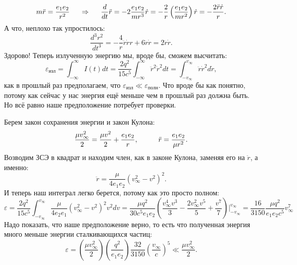 \begin{equation*}
	m \ddot{r} = \frac{e_1 e_2}{r^2}
	\hspace{0.5 cm}
	\Rightarrow
	\hspace{0.5 cm}
	\frac{d}{d t} \ddot{r} = -2 \frac{e_1 e_2}{m r^3} \dot{r} = -\frac{2 }{r} \left(\frac{e_1 e_2}{m r^2}\right) \dot{r} = - \frac{2 \ddot{r} \dot{r}}{r}.
\end{equation*}
А что, неплохо так упростилось:
\begin{equation*}
	\frac{d^3 r^2}{d t^3} = -\frac{4}{r} \ddot{r} \dot{r} r + 6 \ddot{r} \dot{r} = 2 \ddot{r} \dot{r}.
\end{equation*}
Здорово! Теперь излученную энергию мы, вроде бы, сможем высчитать:
\begin{equation*}
	\varepsilon_{\text{изл}} = \int_{-\infty}^{\infty} I(t) d t = \frac{2 q^2}{15 c^5} \int_{-\infty}^{\infty} \ddot{r}^2 \dot{r}^2 d t = \int_{-v_\infty}^{v_\infty} \ddot{r} \dot{r}^2 d \dot{r},
\end{equation*}
как в прошлый раз предполагаем, что $\varepsilon_{\text{изл}} \ll \varepsilon_{\text{полн}}$. Что вроде бы как понятно, потому как сейчас у нас энергия ещё меньше чем в прошлый раз должна быть. Но всё равно наше предположение потребует проверки.

Берем закон сохранения энергии и закон Кулона:
\begin{equation*}
	\frac{\mu v_\infty^2}{2} = \frac{\mu v^2}{2} + \frac{e_1 e_2}{r},
	\hspace{1 cm}
	\ddot{r} = \frac{e_1 e_2}{\mu r^2}.
\end{equation*}
Возводим ЗСЭ в квадрат и находим член, как в законе Кулона, заменяя его на $\ddot{r}$, а именно:
\begin{equation*}
	\ddot{r} = \frac{\mu}{4 e_1 e_2} (v_\infty^2 - v^2)^2.
\end{equation*}
И теперь наш интеграл легко берется, потому как это просто полном:
\begin{equation*}
	\varepsilon =  \frac{2 q^2}{15 c^5} \int_{-v_\infty}^{v_\infty} \frac{\mu}{4 e_2 e_1} (v_\infty^2 - v^2)^2 v^2 d v
	=
	\frac{\mu q^2}{30 c^5 e_1 e_2} \left(\frac{v_\infty^4 v^3}{3} - \frac{2 v_\infty^2 v^5}{5} + \frac{v^7}{7}\right)
	\bigg|_{-v_\infty}^{v_\infty}
	= \frac{16}{3150} \frac{\mu q^2}{e_1 e_2 c^5} v_\infty^7
\end{equation*}
Надо показать, что наше предположение верно, то есть что полученная энергия много меньше энергии сталкивающихся частиц:
\begin{equation*}
	\varepsilon = \left(\frac{\mu v_\infty^2}{2}\right) \left(\frac{q^2}{e_1 e_2}\right) \frac{32}{3150} \left(\frac{v_{\infty}}{c}\right)^5 \ll \frac{\mu v_\infty^2}{2}.
\end{equation*}

